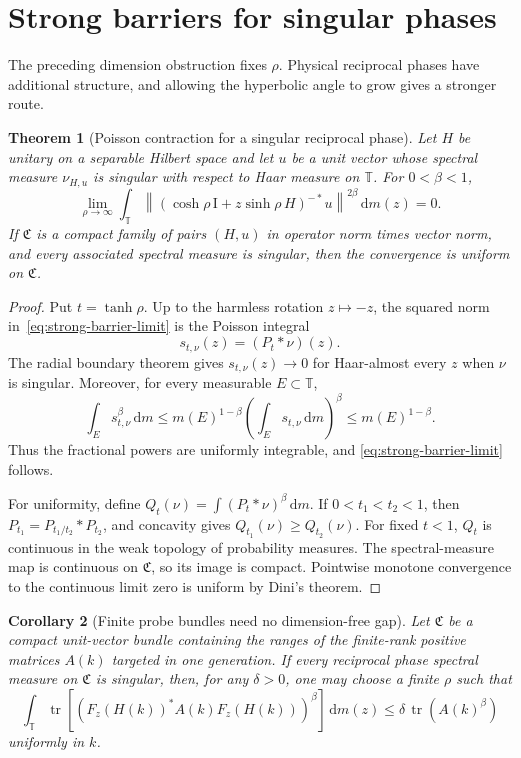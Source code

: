 \documentclass[11pt]{article}
\newtheorem{theorem}{Theorem}[section]
\newtheorem{corollary}[theorem]{Corollary}
\theoremstyle{remark}
\newcommand{\T}{\mathbb T}
\newcommand{\Id}{\mathrm I}
\newcommand{\dd}{\,\mathrm d}
\newcommand{\tr}{\operatorname{tr}}
\begin{document}
\section{Strong barriers for singular phases}

The preceding dimension obstruction fixes $\rho$.  Physical reciprocal
phases have additional structure, and allowing the hyperbolic angle to grow
gives a stronger route.

\begin{theorem}[Poisson contraction for a singular reciprocal phase]
\label{thm:strong-barrier}
Let $H$ be unitary on a separable Hilbert space and let $u$ be a unit vector
whose spectral measure $\nu_{H,u}$ is singular with respect to Haar measure
on $\T$.  For $0<\beta<1$,
\begin{equation}
 \lim_{\rho\to\infty}
 \int_\T
 \left\|
  (\cosh\rho\,\Id+z\sinh\rho\,H)^{-*}u
 \right\|^{2\beta}\dd m(z)=0.
 \label{eq:strong-barrier-limit}
\end{equation}
If $\mathfrak C$ is a compact family of pairs $(H,u)$ in operator norm
times vector norm, and every associated spectral measure is singular, then
the convergence is uniform on $\mathfrak C$.
\end{theorem}

\begin{proof}
Put $t=\tanh\rho$.  Up to the harmless rotation $z\mapsto-z$, the squared
norm in~\eqref{eq:strong-barrier-limit} is the Poisson integral
\[
 s_{t,\nu}(z)=(P_t*\nu)(z).
\]
The radial boundary theorem gives $s_{t,\nu}(z)\to0$ for Haar-almost every
$z$ when $\nu$ is singular.  Moreover, for every measurable $E\subset\T$,
\[
 \int_Es_{t,\nu}^\beta\dd m
 \leq m(E)^{1-\beta}
      \left(\int_Es_{t,\nu}\dd m\right)^\beta
 \leq m(E)^{1-\beta}.
\]
Thus the fractional powers are uniformly integrable, and
\eqref{eq:strong-barrier-limit} follows.

For uniformity, define
$Q_t(\nu)=\int(P_t*\nu)^\beta\dd m$.  If $0<t_1<t_2<1$, then
$P_{t_1}=P_{t_1/t_2}*P_{t_2}$, and concavity gives
$Q_{t_1}(\nu)\geq Q_{t_2}(\nu)$.  For fixed $t<1$, $Q_t$ is continuous in
the weak topology of probability measures.  The spectral-measure map is
continuous on $\mathfrak C$, so its image is compact.  Pointwise monotone
convergence to the continuous limit zero is uniform by Dini's theorem.
\end{proof}

\begin{corollary}[Finite probe bundles need no dimension-free gap]
\label{cor:strong-bundle}
Let $\mathfrak C$ be a compact unit-vector bundle containing the ranges of
the finite-rank positive matrices $A(k)$ targeted in one generation.
If every reciprocal phase spectral measure on $\mathfrak C$ is singular,
then, for any $\delta>0$, one may choose a finite $\rho$ such that
\begin{equation}
 \int_\T\tr[(F_z(H(k))^*A(k)F_z(H(k)))^\beta]\dd m(z)
 \leq\delta\,\tr(A(k)^\beta)
 \label{eq:strong-matrix-contraction}
\end{equation}
uniformly in $k$.
\end{corollary}
\end{document}
